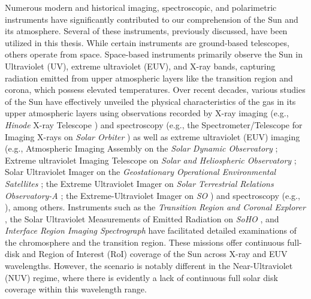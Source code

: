 {Numerous modern and historical imaging, spectroscopic, and polarimetric instruments have significantly contributed to our comprehension of the Sun and its atmosphere. Several of these instruments, previously discussed, have been utilized in this thesis. While certain instruments are ground-based telescopes, others operate from space. Space-based instruments primarily observe the Sun in Ultraviolet (UV), extreme ultraviolet (EUV), and X-ray bands, capturing radiation emitted from upper atmospheric layers like the transition region and corona, which possess elevated temperatures. Over recent decades, various studies of the Sun have effectively unveiled the physical characteristics of the gas in its upper atmospheric layers using observations recorded by X-ray imaging (e.g., {\it Hinode} X-ray Telescope \citep[{\it Hindoe}/XRT,][]{xrt}) and spectroscopy (e.g., the Spectrometer/Telescope for Imaging X-rays on {\it Solar Orbiter} \citep[{\it SO}/STIX,][]{stix}) as well as extreme ultraviolet (EUV) imaging (e.g., Atmospheric Imaging Assembly on the {\it Solar Dynamic Observatory} \cite[{\it SDO}/AIA,][]{aia}; Extreme ultraviolet Imaging Telescope on {\it Solar and Heliospheric Observatory} \cite[{\it SoHO}/EIT,][]{eit}; Solar Ultraviolet Imager on the {\it Geostationary Operational Environmental Satellites} \citep[{\it GOES}/SUVI,][]{suvi}; the Extreme Ultraviolet Imager on {\it Solar Terrestrial Relations Observatory-A} \cite[{\it STEREO-A}/EUVI,][]{stereo,euvi}; the Extreme-Ultraviolet Imager on {\it SO} \citep[{\it SO}/EUI][]{eui}) and spectroscopy (e.g., \citep[Hinode/EIS,][]{eis}), among others. Instruments such as the {\it Transition Region and Coronal Explorer} \citep[{\it TRACE},][]{trace}, the Solar Ultraviolet Measurements of Emitted Radiation on {\it SoHO} \citep[{\it SoHO}/SUMER,][]{sumer}, and {\it Interface Region Imaging Spectrograph} \citep[{\it IRIS},][]{iris} have facilitated detailed examinations of the chromosphere and the transition region. These missions offer continuous full-disk and Region of Interest (RoI) coverage of the Sun across X-ray and EUV wavelengths. However, the scenario is notably different in the Near-Ultraviolet (NUV) regime, where there is evidently a lack of continuous full solar disk coverage within this wavelength range.

}
